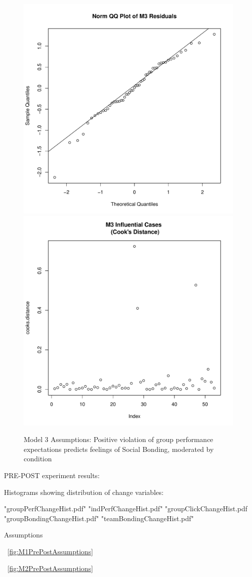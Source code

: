 \begin{figure}[htbp]
    \includegraphics[scale =.4]{images/TEM3QQNorm.pdf}
    \includegraphics[scale =.4]{images/TEM3CooksD.pdf}
    \caption{Model 3 Assumptions: Positive violation of group performance expectations predicts feelings of Social Bonding, moderated by condition}
    \label{fig:M3Assumptions}
\end{figure}








PRE-POST experiment results:

Histograms showing distribution of change variables:

"groupPerfChangeHist.pdf"
"indPerfChangeHist.pdf"
"groupClickChangeHist.pdf
"groupBondingChangeHist.pdf"
"teamBondingChangeHist.pdf"



Assumptions

~\ref{fig:M1PrePostAssumptions}


~\ref{fig:M2PrePostAssumptions}
